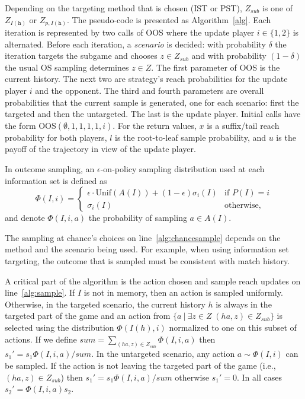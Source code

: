 \documentclass[letterpaper]{article}
\newcommand{\tth}{\mathtt{h}}
\begin{document}
Depending on the targeting method that is chosen (IST or PST), $Z_{sub}$ is one of $Z_{I(\tth)}$ or $Z_{p,I(\tth)}$. 
The pseudo-code is presented as Algorithm~\ref{alg}. 
Each iteration is represented by two calls of OOS where the update player $i \in \{1,2\}$ is alternated. 
Before each iteration, a {\it scenario} is decided: 
with probability $\delta$ the iteration targets the subgame and chooses $z \in Z_{sub}$
and with probability $(1-\delta)$ the usual OS sampling determines $z \in Z$. 
The first parameter of OOS is the current history. 
The next two are strategy's reach probabilities for the update player $i$ and the opponent. 
The third and fourth parameters are overall probabilities that the current sample is generated, one for each scenario: first the targeted and then the untargeted.
The last is the update player. Initial calls have the form OOS$(\emptyset, 1, 1, 1, 1, i)$.  
For the return values, $x$ is a suffix/tail reach probability for both players, 
$l$ is the root-to-leaf sample probability, and $u$ is the payoff of the trajectory in view 
of the update player. 

In outcome sampling, an $\epsilon$-on-policy sampling distribution used at each information set
is defined as 
\begin{equation*}
\label{eq:ossample}
\Phi(I,i) = \left\{
\begin{array}{ll}
\epsilon \cdot \mbox{Unif}(A(I)) + (1-\epsilon)\sigma_i(I) & \mbox{if } P(I) = i\\ 
\sigma_i(I)                                          & \mbox{otherwise,}
\end{array} \right.
\end{equation*}
and denote $\Phi(I,i,a)$ the probability of sampling $a \in A(I)$. 

The sampling at chance's choices on line~\ref{alg:chancesample} depends on the method and the scenario being used. For example, when using information set targeting, the outcome that is sampled must be consistent with match history.

A critical part of the algorithm is the action chosen and sample reach updates on line~\ref{alg:sample}. If $I$ is not in memory, then an action is sampled uniformly. Otherwise, in the targeted scenario, the current history $h$ is always in the targeted part of the game and an action from $\{a~|~\exists z\in Z \; (ha,z)\in Z_{sub}\}$ is selected using the distribution $\Phi(I(h),i)$ normalized to one on this subset of actions. If we define $sum=\sum_{(ha,z)\in Z_{sub}}\Phi(I,i,a)$ then $s_1' = s_1\Phi(I,i,a)/sum$. In the untargeted scenario, any action $a \sim \Phi(I,i)$ can be sampled. If the action is not leaving the targeted part of the game (i.e., $(ha,z)\in Z_{sub}$) then $s_1' = s_1\Phi(I,i,a)/sum$ otherwise $s_1'=0$. In all cases $s_2' = \Phi(I,i,a) s_2$.
\end{document}
